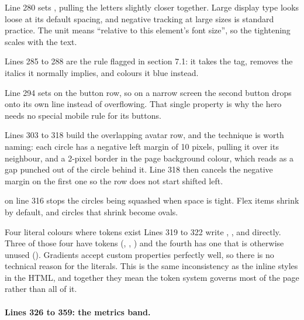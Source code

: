 Line 280 sets , pulling the letters slightly closer
together. Large display type looks loose at its default spacing, and negative
tracking at large sizes is standard practice. The unit  means ``relative
to this element's font size'', so the tightening scales with the text.

Lines 285 to 288 are the rule flagged in section 7.1: it takes the  tag,
removes the italics it normally implies, and colours it blue instead.

Line 294 sets  on the button row, so on a narrow screen the
second button drops onto its own line instead of overflowing. That single property
is why the hero needs no special mobile rule for its buttons.

Lines 303 to 318 build the overlapping avatar row, and the technique is worth
naming: each circle has a negative left margin of 10 pixels, pulling it over its
neighbour, and a 2-pixel border in the page background colour, which reads as a gap
punched out of the circle behind it. Line 318 then cancels the negative margin on
the first one so the row does not start shifted left.

 on line 316 stops the circles being squashed when space is
tight. Flex items shrink by default, and circles that shrink become ovals.

\begin{honest}{Four literal colours where tokens exist}
Lines 319 to 322 write , ,  and
 directly. Three of those four have tokens (,
, ) and the fourth has one that is otherwise unused
(). Gradients accept custom properties perfectly well, so there is
no technical reason for the literals. This is the same inconsistency as the inline
styles in the HTML, and together they mean the token system governs most of the
page rather than all of it.
\end{honest}

\paragraph{Lines 326 to 359: the metrics band.}

